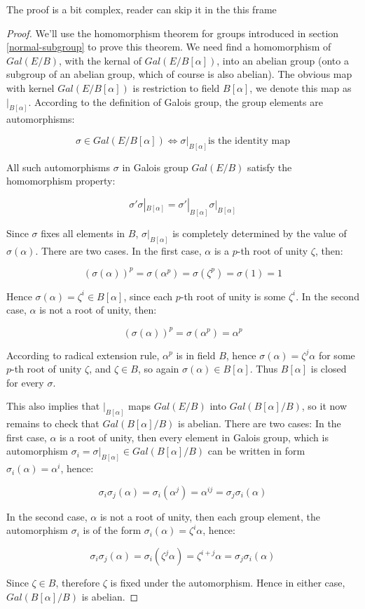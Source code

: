 \documentclass[b5paper]{article}
\begin{document}
\begin{mdframed}
The proof is a bit complex, reader can skip it in the this frame
\begin{proof}
We'll use the homomorphism theorem for groups introduced in section \ref{normal-subgroup} to prove this theorem. We need find a homomorphism of $Gal(E/B)$, with the kernal of $Gal(E/B[\alpha])$, into an abelian group (onto a subgroup of an abelian group, which of course is also abelian). The obvious map with kernel $Gal(E/B[\alpha])$ is restriction to field $B[\alpha]$, we denote this map as $|_{B[\alpha]}$. According to the definition of Galois group, the group elements are automorphisms:

\[
\sigma \in Gal(E/B[\alpha]) \iff \sigma|_{B[\alpha]} \text{is the identity map}
\]

All such automorphisms $\sigma$ in Galois group $Gal(E/B)$ satisfy the homomorphism property:

\[
\sigma'\sigma|_{B[\alpha]} = \sigma'|_{B[\alpha]}\sigma|_{B[\alpha]}
\]

Since $\sigma$ fixes all elements in $B$, $\sigma|_{B[\alpha]}$ is completely determined by the value of $\sigma(\alpha)$. There are two cases. In the first case, $\alpha$ is a $p$-th root of unity $\zeta$, then:

\[
(\sigma(\alpha))^p = \sigma(\alpha^p) = \sigma(\zeta^p) = \sigma(1) = 1
\]

Hence $\sigma(\alpha) = \zeta^i \in B[\alpha]$, since each $p$-th root of unity is some $\zeta^i$. In the second case, $\alpha$ is not a root of unity, then:

\[
(\sigma(\alpha))^p = \sigma(\alpha^p) = \alpha^p
\]

According to radical extension rule, $\alpha^p$ is in field $B$, hence $\sigma(\alpha) = \zeta^j\alpha$ for some $p$-th root of unity $\zeta$, and $\zeta \in B$, so again $\sigma(\alpha) \in B[\alpha]$. Thus $B[\alpha]$ is closed for every $\sigma$.

This also implies that $|_{B[\alpha]}$ maps $Gal(E/B)$ into $Gal(B[\alpha]/B)$, so it now remains to check that $Gal(B[\alpha]/B)$ is abelian. There are two cases: In the first case, $\alpha$ is a root of unity, then every element in Galois group, which is automorphism $\sigma_i = \sigma|_{B[\alpha]} \in Gal(B[\alpha]/B)$ can be written in form $\sigma_i(\alpha) = \alpha^i$, hence:

\[
\sigma_i\sigma_j(\alpha) = \sigma_i(\alpha^j) = \alpha^{ij} = \sigma_j\sigma_i(\alpha)
\]

In the second case, $\alpha$ is not a root of unity, then each group element, the automorphism $\sigma_i$ is of the form $\sigma_i(\alpha) = \zeta^i\alpha$, hence:

\[
\sigma_i\sigma_j(\alpha) = \sigma_i(\zeta^j\alpha) = \zeta^{i + j}\alpha = \sigma_j\sigma_i(\alpha)
\]

Since $\zeta \in B$, therefore $\zeta$ is fixed under the automorphism. Hence in either case, $Gal(B[\alpha]/B)$ is abelian.
\end{proof}
\end{mdframed}
\end{document}
